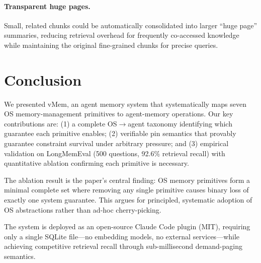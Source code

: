 \documentclass[10pt,twocolumn]{article}
\begin{document}
\paragraph{Transparent huge pages.} Small, related chunks could be automatically consolidated into larger ``huge page'' summaries, reducing retrieval overhead for frequently co-accessed knowledge while maintaining the original fine-grained chunks for precise queries.

\section{Conclusion}
\label{sec:conclusion}

We presented vMem, an agent memory system that systematically maps seven OS memory-management primitives to agent-memory operations. Our key contributions are: (1) a complete OS$\to$agent taxonomy identifying which guarantee each primitive enables; (2) verifiable pin semantics that provably guarantee constraint survival under arbitrary pressure; and (3) empirical validation on LongMemEval (500 questions, 92.6\% retrieval recall) with quantitative ablation confirming each primitive is necessary.

The ablation result is the paper's central finding: OS memory primitives form a minimal complete set where removing any single primitive causes binary loss of exactly one system guarantee. This argues for principled, systematic adoption of OS abstractions rather than ad-hoc cherry-picking.

The system is deployed as an open-source Claude Code plugin (MIT), requiring only a single SQLite file---no embedding models, no external services---while achieving competitive retrieval recall through sub-millisecond demand-paging semantics.



\end{document}
